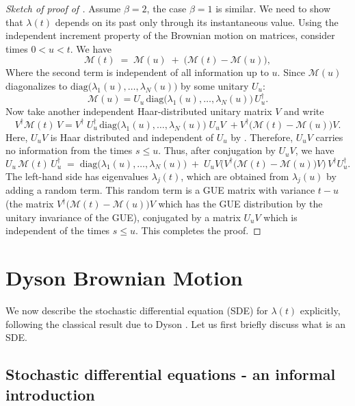 \documentclass[letterpaper,11pt,oneside,reqno]{book}
\numberwithin{equation}{chapter}  %
\theoremstyle{definition}
\begin{document}
\begin{proof}[Sketch of proof of ]
Assume $\beta=2$, the case $\beta=1$ is similar.
We need to show that $\lambda(t)$ depends on its past only through its instantaneous value. Using the independent increment property of the Brownian motion on matrices,
consider times $0< u< t$. We have
\[
	\mathcal{M}(t) \;=\; \mathcal{M}(u)\;+\;\bigl(\mathcal{M}(t)-\mathcal{M}(u)\bigr),
\]
Where the second term is independent of all information up to $u$.
Since $\mathcal{M}(u)$ diagonalizes to $\mathrm{diag}\bigl(\lambda_1(u),\ldots,\lambda_N(u)\bigr)$ by some unitary $U_u$:
\begin{equation*}
	\mathcal{M}(u)=U_u\,\mathrm{diag}\bigl(\lambda_1(u),\ldots,\lambda_N(u)\bigr)\,U_u^\dagger.
\end{equation*}
Now take another independent Haar-distributed unitary matrix $V$ and
write
\[
	V^\dagger\mathcal{M}(t)\,V=V^\dagger\;U_u^\dagger\,\mathrm{diag}\bigl(\lambda_1(u),\ldots,\lambda_N(u)\bigr)\;U_u V\;+V^\dagger\bigl(\mathcal{M}(t)-\mathcal{M}(u)\bigr)V.
\]
Here, $U_uV$ is Haar distributed and independent of $U_u$ by .
Therefore, $U_uV$ carries no information from the times $s\le u$.
Thus, after conjugation by $U_uV$, we have
\[
U_u\,\mathcal{M}(t)\,U_u^\dagger\;=\;\mathrm{diag}\bigl(\lambda_1(u),\ldots,\lambda_N(u)\bigr)\;+\; U_u V\bigl(V^\dagger\bigl(\mathcal{M}(t)-\mathcal{M}(u)\bigr)V\bigr)\,V^\dagger U_u^\dagger.
\]
The left-hand side
has eigenvalues $\lambda_j(t)$, which are obtained from $\lambda_j(u)$
by adding a random term.
This random term is a GUE matrix with variance $t-u$
(the matrix $V^\dagger\bigl(\mathcal{M}(t)-\mathcal{M}(u)\bigr)V$ which has the GUE distribution
by the unitary invariance of the GUE),
conjugated by a matrix $U_uV$ which is independent of the times $s \le u$.
This completes the proof.
\end{proof}

\section{Dyson Brownian Motion}
We now describe the stochastic differential equation (SDE)
for $\lambda(t)$ explicitly, following the classical result due to Dyson
\cite{dyson1962brownian}. Let us first briefly discuss what is an SDE.

\subsection{Stochastic differential equations - an informal introduction}
\end{document}
